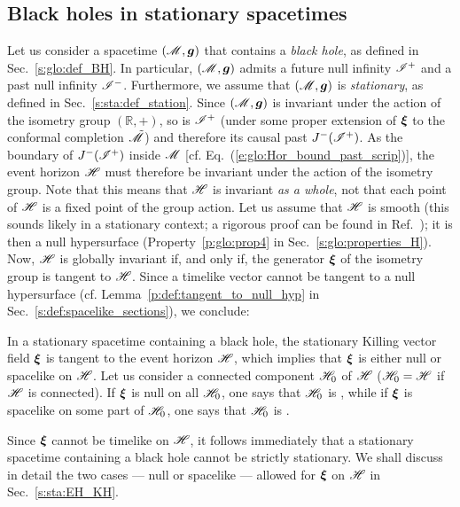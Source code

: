 \subsection{Black holes in stationary spacetimes}
\label{s:sta:BH_stationary}

Let us consider a spacetime $(\mathscr{M},\bm{g})$ that contains a \emph{black hole}, as defined in
Sec.~\ref{s:glo:def_BH}. In particular, $(\mathscr{M},\bm{g})$ admits a future null
infinity $\mathscr{I}^+$ and a past null infinity $\mathscr{I}^-$.
Furthermore, we assume that $(\mathscr{M},\bm{g})$ is \emph{stationary},
as defined in Sec.~\ref{s:sta:def_station}.
Since $(\mathscr{M},\bm{g})$ is invariant under the action of the isometry group $(\mathbb{R},+)$,
so is $\mathscr{I}^+$ (under some proper extension of $\bm{\xi}$ to the conformal
completion $\tilde{\mathscr{M}}$)
and therefore its causal past $J^-(\mathscr{I}^+)$. As the boundary of $J^-(\mathscr{I}^+)$
inside $\mathscr{M}$ [cf. Eq.~(\ref{e:glo:Hor_bound_past_scrip})],
the event horizon $\mathscr{H}$ must therefore be invariant under the
action of the isometry group.
Note that this means that $\mathscr{H}$ is invariant \emph{as a whole}, not that
each point of $\mathscr{H}$ is a fixed point of the group action.
Let us assume that $\mathscr{H}$ is smooth (this sounds likely in a stationary context;
a rigorous proof can be found in Ref.~\cite{ChrusDGH01});
it is then a null hypersurface (Property~\ref{p:glo:prop4} in Sec.~\ref{s:glo:properties_H}).
Now, $\mathscr{H}$ is globally invariant if, and only if, the
generator $\bm{\xi}$ of the isometry group is tangent to $\mathscr{H}$.
Since a timelike vector cannot be tangent to a null hypersurface (cf.
Lemma~\ref{p:def:tangent_to_null_hyp} in Sec.~\ref{s:def:spacelike_sections}), we conclude:

\begin{prop}
\label{p:sta:xi_tangent_H}
In a stationary spacetime containing a black hole,
the stationary Killing vector field  $\bm{\xi}$ is tangent to the event horizon
$\mathscr{H}$, which implies that $\bm{\xi}$ is either null or spacelike on $\mathscr{H}$.
Let us consider a connected component $\mathscr{H}_0$ of $\mathscr{H}$
($\mathscr{H}_0 = \mathscr{H}$ if $\mathscr{H}$ is connected).
If $\bm{\xi}$ is null on all $\mathscr{H}_0$, one says that $\mathscr{H}_0$
is , while if $\bm{\xi}$ is
spacelike on some part of $\mathscr{H}_0$, one says that $\mathscr{H}_0$ is
.
\end{prop}

Since $\bm{\xi}$ cannot be timelike on $\mathscr{H}$, it follows immediately
that a stationary spacetime containing a black hole cannot be strictly stationary.
We shall discuss in detail the two cases --- null or spacelike --- allowed
for $\bm{\xi}$ on $\mathscr{H}$ in Sec.~\ref{s:sta:EH_KH}.

